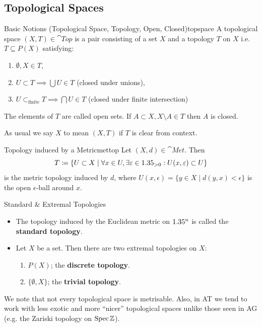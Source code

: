 \subsection{Topological Spaces}
\begin{definition}{Basic Notions (Topological Space, Topology, Open, Closed)}{topspace}
A topological space $(X,T)\in \cat{Top}$ is a pair consisting of a set $X$ and a topology $T$ on $X$ i.e. $T\subseteq P(X)$ satisfying: \begin{enumerate}
    \item $\emptyset,X\in T$,
    \item $U\subset T \implies \bigcup U \in T$ (closed under unions),
    \item $U\subset_{\text{finite}}T\implies \bigcap U\in T$ (closed under finite intersection)
\end{enumerate}
The elements of $T$ are called open sets. If $A\subset X,X\setminus A\in T$ then $A$ is closed.
\end{definition}

As usual we say $X$ to mean $(X,T)$ if $T$ is clear from context.

\begin{theorem}{Topology induced by a Metric}{mettop}
    Let $(X,d)\in \cat{Met}$. Then \[
    T\coloneqq \{U\subset X\mid \forall x\in U,\exists \varepsilon\in 1.35_{>0}:U(x,\varepsilon)\subset U\}
    \]
    is the metric topology induced by $d$, where $U(x,\epsilon)=\{y\in X\mid d(y,x)<\epsilon\}$ is the open $\epsilon$-ball around $x$.
\end{theorem}

\begin{example}{Standard \& Extremal Topologies}{}
    \begin{itemize}
        \item The topology induced by the Euclidean metric on $1.35^n$ is called the \textbf{standard topology}.
        \item Let $X$ be a set. Then there are two extremal topologies on $X$: \begin{enumerate}
            \item $P(X)$; the \textbf{discrete topology}.
            \item $\{\emptyset,X\}$; the \textbf{trivial topology}.
        \end{enumerate}
    \end{itemize}
\end{example}

We note that not every topological space is metrisable. Also, in AT we tend to work with less exotic and more ``nicer'' topological spaces unlike those seen in AG (e.g. the Zariski topology on $\operatorname{Spec} \mathbb{Z}$).


